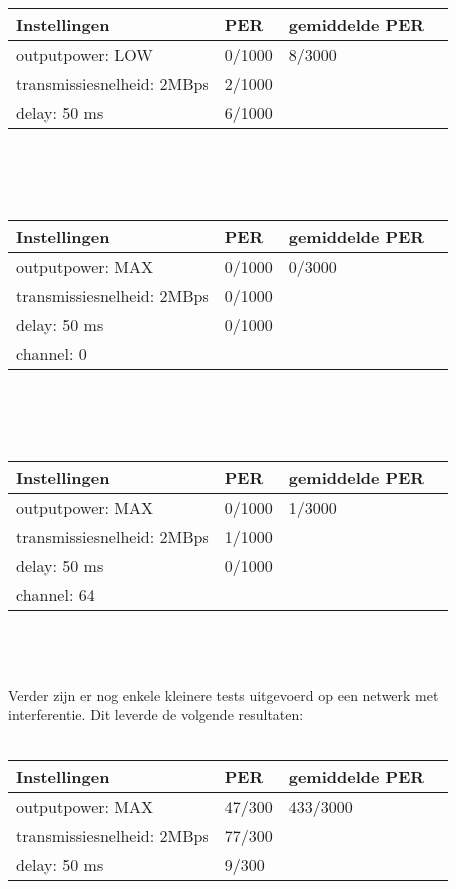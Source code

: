 \documentclass{article}
\begin{document}
\\
\\
    \begin{tabular}{ | l | l | l | p{5cm} |}
    \hline
    Instellingen				& PER 		& gemiddelde PER\\ \hline
    outputpower: LOW 			& 0/1000 	& 8/3000		\\ 
    transmissiesnelheid: 2MBps 	& 2/1000 	&   			\\ 
    delay: 50 ms 				& 6/1000 	&  				\\ \hline
    \end{tabular}\\
\\
\\
    \begin{tabular}{ | l | l | l | p{5cm} |}
    \hline
    Instellingen				& PER 		& gemiddelde PER\\ \hline
    outputpower: MAX 			& 0/1000 	&  0/3000		\\ 
    transmissiesnelheid: 2MBps 	& 0/1000 	&   			\\ 
    delay: 50 ms 				& 0/1000 	&				\\ 
    channel: 0 					&  			&  				\\ \hline
    \end{tabular}\\
\\
\\
    \begin{tabular}{ | l | l | l | p{5cm} |}
    \hline
    Instellingen				& PER 		& gemiddelde PER\\ \hline
    outputpower: MAX 			& 0/1000 	& 1/3000		\\ 
    transmissiesnelheid: 2MBps 	& 1/1000 	&  				\\ 
    delay: 50 ms 				& 0/1000 	&  				\\ 
    channel: 64 				&  			&				\\ \hline
    \end{tabular}\\
\\
\\
Verder zijn er nog enkele kleinere tests uitgevoerd op een netwerk met interferentie. Dit leverde de volgende resultaten:\\
\\
\begin{tabular}{ | l | l | l | p{5cm} |}
    \hline
    Instellingen				& PER 		& gemiddelde PER\\ \hline
    outputpower: MAX 			& 47/300 	& 433/3000		\\ 
    transmissiesnelheid: 2MBps 	& 77/300 	&  				\\ 
    delay: 50 ms 				& 9/300 	&  				\\ \hline
    \end{tabular}\\
\end{document}
